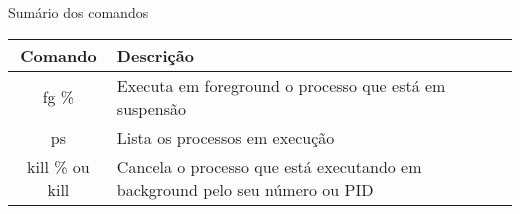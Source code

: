 \documentclass{beamer}
\begin{document}
\begin{frame}{Sumário dos comandos}
\begin{center}
 \begin{tabular}{|| c | p{9cm}||} 
 \hline
 \textbf{Comando} & \textbf{Descri\c{c}ão}\\ [0.5ex] 
 \hline\hline
 fg \% & Executa em foreground o processo que está em suspensão\\
 \hline
 ps & Lista os processos em execu\c{c}ão\\
 \hline
 kill \% ou kill & Cancela o processo que está executando em background pelo seu número ou PID\\
 \hline
\end{tabular}
\end{center}
\end{frame}
\end{document}
